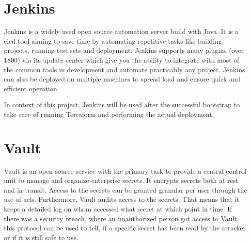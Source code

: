 \section{Jenkins}
Jenkins is a widely used open source automation server build with Java.
It is a \ac{cicd} tool aiming to save time by automating repetitive tasks like building projects, running test sets and deployment.
Jenkins supports many plugins (over 1800) via its update center which give you the ability to integrate with most of the common tools in development and automate practicably any project.
Jenkins can also be deployed on multiple machines to spread load and ensure quick and efficient operation.
\cite{jenkins.io, jenkins.github, gitlab.cicd}

In context of this project, Jenkins will be used after the successful bootstrap to take care of running Terraform and performing the actual deployment.

    

\section{Vault}
\label{sec:vault}
Vault is an open source service with the primary task to provide a central control unit to manage and organize enterprise secrets.
It encrypts secrets both at rest and in transit.
Access to the secrets can be granted granular per user through the use of \acp{acl}.
Furthermore, Vault audits access to the secrets.
That means that it keeps a detailed log on whom accessed what secret at which point in time.
If there was a security breach, where an unauthorized person got access to Vault, this protocol can be used to tell, if a specific secret has been read by the attacker or if it is still safe to use.

